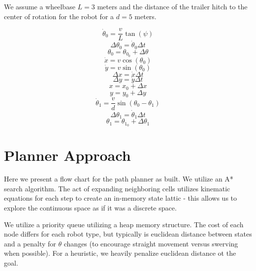 \documentclass{article}
\begin{document}
We assume a wheelbase $L=3$ meters and the distance of the trailer hitch to the center of rotation for the robot for a $d=5$ meters.

\begin{equation}
    \dot{\theta}_0 = \frac{v}{L} \tan(\psi)
\end{equation}
\begin{equation}
    \Delta \theta_0 = \dot{\theta}_0 \Delta t
\end{equation}
\begin{equation}
    \theta_0 = \theta_{0_0} + \Delta \theta
\end{equation}
\begin{equation}
    \dot{x} = v \cos(\theta_0)
\end{equation}
\begin{equation}
    \dot{y} = v \sin(\theta_0)
\end{equation}
\begin{equation}
    \Delta x = \dot{x} \Delta t
\end{equation}
\begin{equation}
    \Delta y = \dot{y} \Delta t
\end{equation}
\begin{equation}
    x = x_0 + \Delta x
\end{equation}
\begin{equation}
    y = y_0 + \Delta y
\end{equation}
\begin{equation}
    \dot{\theta}_1 = \frac{v}{d}\sin(\theta_0 - \theta_1)
\end{equation}
\begin{equation}
    \Delta \theta_1 = \dot{\theta}_1 \Delta t
\end{equation}
\begin{equation}
    \theta_1 = \theta_{1_0} + \Delta \theta_1
\end{equation}

\section*{Planner Approach}

Here we present a flow chart for the path planner as built. We utilize an A* search algorithm. The act of expanding neighboring cells utilizes kinematic equations for each step to create an in-memory state lattic - this allows us to explore the continuous space as if it was a discrete space.

We utilize a priority queue utilizing a heap memory structure. The cost of each node differs for each robot type, but typically is euclidean distance between states and a penalty for $\theta$ changes (to encourage straight movement versus swerving when possible). For a heuristic, we heavily penalize euclidean distance ot the goal.
\end{document}
